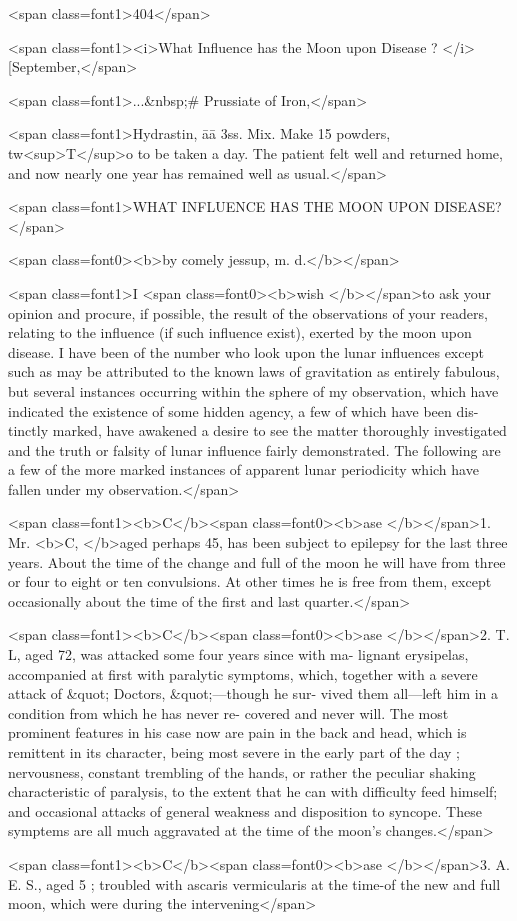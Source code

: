 <span class=font1>404</span>

<span class=font1><i>What Influence has the Moon upon Disease ? </i>[September,</span>

<span class=font1>...&nbsp;#   Prussiate of Iron,</span>

<span class=font1>Hydrastin, āā 3ss.
Mix.   Make 15 powders, tw<sup>T</sup>o to be taken a day.   The patient felt
well and returned home, and now nearly one year has remained well as
usual.</span>

<span class=font1>WHAT INFLUENCE HAS THE MOON UPON DISEASE?</span>

<span class=font0><b>by comely jessup, m. d.</b></span>

<span class=font1>I <span class=font0><b>wish </b></span>to ask your opinion and procure, if possible, the result of the
observations of your readers, relating to the influence (if such influence
exist), exerted by the moon upon disease. I have been of the number
who look upon the lunar influences except such as may be attributed to
the known laws of gravitation as entirely fabulous, but several instances
occurring within the sphere of my observation, which have indicated
the existence of some hidden agency, a few of which have been dis-
tinctly marked, have awakened a desire to see the matter thoroughly
investigated and the truth or falsity of lunar influence fairly demonstrated.
The following are a few of the more marked instances of apparent lunar
periodicity which have fallen under my observation.</span>

<span class=font1><b>C</b><span class=font0><b>ase </b></span>1. Mr. <b>C, </b>aged perhaps 45, has been subject to epilepsy for
the last three years. About the time of the change and full of the
moon he will have from three or four to eight or ten convulsions. At
other times he is free from them, except occasionally about the time of
the first and last quarter.</span>

<span class=font1><b>C</b><span class=font0><b>ase </b></span>2. T. L, aged 72, was attacked some four years since with ma-
lignant erysipelas, accompanied at first with paralytic symptoms,
which, together with a severe attack of &quot; Doctors, &quot;—though he sur-
vived them all—left him in a condition from which he has never re-
covered and never will. The most prominent features in his case now
are pain in the back and head, which is remittent in its character,
being most severe in the early part of the day ; nervousness, constant
trembling of the hands, or rather the peculiar shaking characteristic of
paralysis, to the extent that he can with difficulty feed himself; and
occasional attacks of general weakness and disposition to syncope.
These symptems are all much aggravated at the time of the moon's
changes.</span>

<span class=font1><b>C</b><span class=font0><b>ase </b></span>3. A. E. S., aged 5 ; troubled with ascaris vermicularis at
the time-of the new and full moon, which were during the intervening</span>

